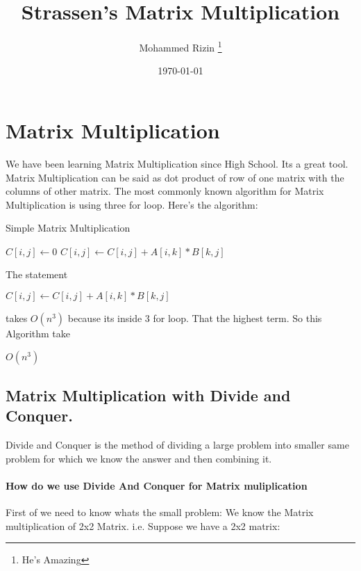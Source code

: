 \documentclass[11pt, a4paper]{article}
\title{Strassen's Matrix Multiplication }
\author[1] {Mohammed Rizin \footnote{He's Amazing}}
\affiliation[1]{Umemployed, Navi Mumbai, Maharashtra}
\date{\today}
\begin{document}
\maketitle
\flushbottom

\section {Matrix Multiplication}
We have been learning Matrix Multiplication since High School. Its a great tool. Matrix Multiplication can be said as dot product of row of one matrix with the columns of other matrix.
The most commonly known algorithm for Matrix Multiplication is using three for loop. Here's the algorithm:

\begin{algorithm}
    \caption{Simple Matrix Multiplication}
    \begin{algorithmic}
                    \State $C[i, j] \gets 0$
                        \State $C[i, j] \gets C[i, j] + A[i, k] * B[k, j]$
                    \EndFor
                \EndFor
            \EndFor
        \EndProcedure
    \end{algorithmic}
\end{algorithm}

The statement
\begin{algorithmic}
\State $C[i, j] \gets C[i, j] + A[i, k] * B[k, j]$
\end{algorithmic}
takes $O(n^3)$ because its inside 3 for loop. That the highest term. So this Algorithm take 
\begin{center}
    $\boxed{O(n^3)}$
\end{center}

\subsection{Matrix Multiplication with Divide and Conquer.}
Divide and Conquer is the method of dividing a large problem into smaller same problem for which we know the answer and then combining it. 


\paragraph{How do we use Divide And Conquer for Matrix muliplication}
First of we need to know whats the small problem: 
We know the Matrix multiplication of 2x2 Matrix. i.e.
Suppose we have a 2x2 matrix:\\
\end{document}
